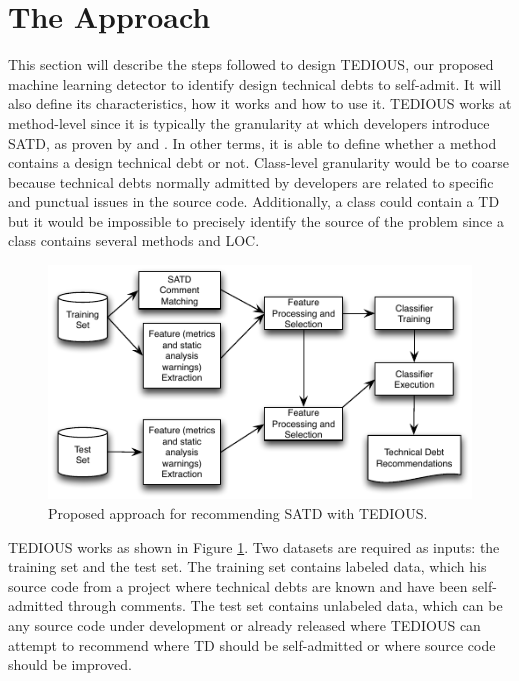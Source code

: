 \label{sec:Theme1}


\section{The Approach}


This section will describe the steps followed to design \ac{TEDIOUS}, our proposed machine learning detector to identify design technical debts to self-admit. It will also define its characteristics, how it works and how to use it. \ac{TEDIOUS} works at method-level since it is typically the granularity at which developers introduce \ac{SATD}, as proven by \citet{MaldonadoS15} and \citet{PotdarS14}. In other terms, it is able to define whether a method contains a design technical debt or not. Class-level granularity would be to coarse because technical debts normally admitted by developers are related to specific and punctual issues in the source code. Additionally, a class could contain a \ac{TD} but it would be impossible to precisely identify the source of the problem since a class contains several methods and \ac{LOC}. \par 

\begin{figure}[t]
	\centering
	\includegraphics[width=\linewidth]{figs/approach.pdf}
	\caption{Proposed approach for recommending SATD with TEDIOUS.}
	\label{fig:approach}
	\vspace{-4mm}
\end{figure}

\ac{TEDIOUS} works as shown in Figure \ref{fig:approach}. Two datasets are required as inputs: the training set and the test set. The training set contains labeled data, which his source code from a project where technical debts are known and have been self-admitted through comments. The test set contains unlabeled data, which can be any source code under development or already released where \ac{TEDIOUS} can attempt to recommend where \ac{TD} should be self-admitted or where source code should be improved. \par 
	
